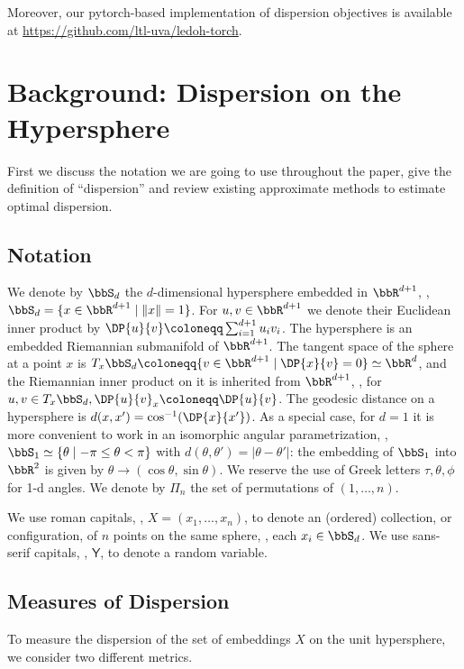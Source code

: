 \documentclass[10pt]{article} %
\newcommand\var[1]{\textsf{#1}}
\begin{document}
Moreover, our pytorch-based implementation of dispersion objectives is available at \url{https://github.com/ltl-uva/ledoh-torch}.

\section{Background: Dispersion on the Hypersphere}

First we discuss the notation we are going to use throughout the paper, give the definition of ``dispersion'' and review existing approximate methods to estimate optimal dispersion.

\label{sec:disp-on-hypersphere}
\subsection{Notation}
\label{sec:notation}
We denote by \(\bbS_d\) the \(d\)-dimensional hypersphere embedded in \(\bbR^{d+1}\),
\ie, \(\bbS_d = \{ x \in \bbR^{d+1} \mid \|x\|=1\}\).
For \(u,v \in \bbR^{d+1}\) we denote their Euclidean inner product by \(\DP{u}{v} \coloneqq \sum_{i=1}^{d+1} u_i v_i\).
The hypersphere is an embedded Riemannian submanifold of \(\bbR^{d+1}\).
The tangent space of the sphere at a point \(x\) is \(T_x \bbS_d \coloneqq \{v \in \bbR^{d+1} \mid \DP{x}{v}=0\}
\simeq \bbR^d\), and the Riemannian inner product on it is inherited from \(\bbR^{d+1}\), \ie,
for \(u,v \in T_x\bbS_d, \DP{u}{v}_x \coloneqq \DP{u}{v}\).
The geodesic distance on a hypersphere is \(d(x, x') = \cos^{-1}(\DP{x}{x'})\).
As a special case, for \(d=1\) it is more convenient to work in an isomorphic angular parametrization, \ie,
\(\bbS_1 \simeq \{\theta \mid -\pi \leq \theta < \pi\}\) with \(d(\theta, \theta') = |\theta-\theta'|\):
the embedding of \(\bbS_1\) into \(\bbR^2\) is given by \(\theta \to (\cos \theta, \sin \theta)\).
We reserve the use of Greek letters \(\tau,\theta,\phi\) for 1-d angles. We denote by \(\Pi_n\) the set
of permutations of \((1, \ldots, n)\).

We use roman capitals, \ie,
\(X = (x_1, \ldots, x_n)\), to denote an (ordered) collection, or configuration,
of \(n\) points on the same sphere, \ie, each \(x_i \in \bbS_d\).
We use sans-serif capitals, \ie, \(\var{Y}\), to denote a random variable.

\subsection{Measures of Dispersion}
\label{sec:dispersion-measures}
To measure the dispersion of the set of embeddings $X$ on the unit hypersphere, we consider two different metrics.
\end{document}
